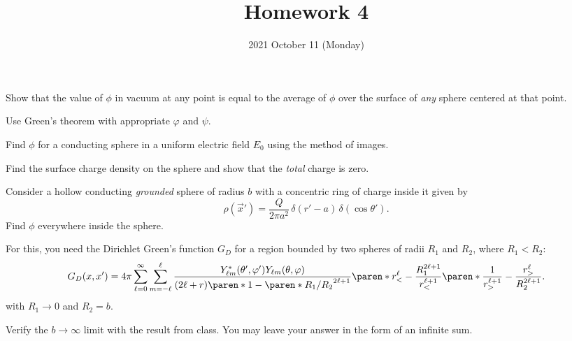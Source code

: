 \documentclass{phys151}
\title{Homework 4}
\date{2021 October 11 (Monday)}
\author{}
\begin{document}
\begin{problem}
  Show that the value of \(\phi\) in vacuum at any point is equal to the
  average of \(\phi\) over the surface of \emph{any} sphere centered at that
  point.
  \begin{hint}
    Use Green's theorem with appropriate \(\varphi\) and \(\psi\).
  \end{hint}
\end{problem}

\begin{solution}

\end{solution}

\begin{problem}
  \leavevmode
  \begin{subproblems}
  \item Find \(\phi\) for a conducting sphere in a uniform electric field
    \(E_0\) using the method of images.
  \item Find the surface charge density on the sphere and show that the
    \emph{total} charge is zero.
  \end{subproblems}
\end{problem}

\begin{solution}

\end{solution}

\begin{problem}
  Consider a hollow conducting \emph{grounded} sphere of radius \(b\) with a
  concentric ring of charge inside it given by
  \[
    \rho(\vec x') = \frac Q {2 \pi a^2} \, \delta(r'-a) \, \delta(\cos \theta').
  \]
  Find \(\phi\) everywhere inside the sphere.
  \begin{hint}
    For this, you need the Dirichlet Green's function \(G_D\) for a region
    bounded by two spheres of radii \(R_1\) and \(R_2\), where \(R_1 < R_2\):
    \[
      G_D(x, x') = 4 \pi \sum_{\ell=0}^\infty \sum_{m=-\ell}^\ell
      \frac
      {Y_{\ell m}^* (\theta', \varphi') Y_{\ell m} (\theta, \varphi)}
      {(2\ell+r) \paren* {1 - \paren* {R_1/R_2}^{2\ell+1}}}
      \paren* {r_<^\ell - \frac {R_1^{2\ell+1}} {r_<^{\ell+1}}}
      \paren* {\frac 1 {r_>^{\ell+1}} - \frac {r_>^\ell} {R_2^{2\ell+1}}}.
    \]
    with \(R_1 \to 0\) and \(R_2 = b\).
  \end{hint}
  Verify the \(b \to \infty\) limit with the result from class.  You may leave
  your answer in the form of an infinite sum.
\end{problem}
\end{document}
